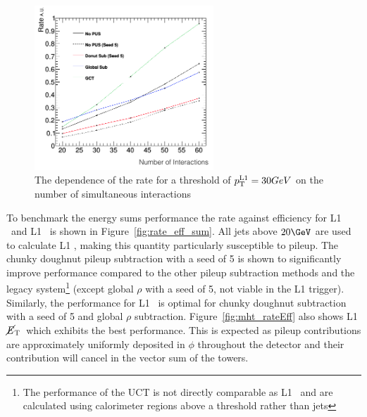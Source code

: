 \begin{figure}
\centering
    \includegraphics[width=0.6\textwidth]{./Figures/triggerUpgrade/neutrinonvtx_jet1}
  \caption{The dependence of the rate for a threshold of ${p_{\text T}^{\text{L1}}}=30GeV$ on the number of simultaneous interactions}
  \label{fig:rate_nvtx}
\end{figure}

To benchmark the energy sums performance the rate against efficiency for L1 \scalht~and L1 \mht~is shown in Figure~\ref{fig:rate_eff_sum}.
All jets above $20\GeV$ are used to calculate L1 \scalht, making this quantity particularly susceptible to pileup. The chunky doughnut 
pileup subtraction with a seed of 5 is shown to significantly improve performance compared to the other pileup subtraction
methods and the legacy system\footnote{The performance of the UCT is not 
directly comparable as L1 \scalht~and \mht are calculated using calorimeter regions above a threshold
rather than jets} (except global $\rho$ with a seed of 5, not viable in the L1 trigger). Similarly, the performance for 
L1 \mht~is optimal for chunky doughnut subtraction with a seed of 5 and global $\rho$ subtraction. 
Figure~\ref{fig:mht_rateEff} also shows L1 $\mbox{$\cancel{E}_\text{T}$}$~which exhibits the best performance. This is expected as 
pileup contributions are approximately uniformly deposited in $\phi$ throughout the detector and their contribution will
cancel in the vector sum of the towers.

